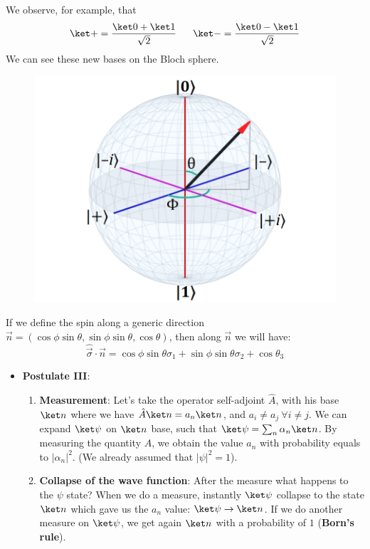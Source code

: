 \noindent We observe, for example, that
\begin{equation*}
    \ket + = \frac{\ket 0 + \ket 1}{\sqrt 2} \ \ \ \ \ \ket - = \frac{\ket 0 - \ket 1}{\sqrt 2}
\end{equation*}
\noindent We can see these new bases on the Bloch sphere.
\newline
\begin{figure}[!ht]
    \centering
    \includegraphics[scale=0.5]{images/chapter1/bloch-hdr-440.png}
    \label{fig:BlochSphere2}
\end{figure}
\newline
\noindent If we define the spin along a generic direction $\vec n = (\cos\phi\sin\theta, \sin\phi\sin\theta, \cos\theta)$, then along $\vec n$ we will have:
\begin{equation*}
    \hat{\vec{\sigma}} \cdot \vec n = \cos\phi\sin\theta\sigma_1+\sin\phi\sin\theta\sigma_2+\cos\theta_3
\end{equation*}
\begin{itemize}
    \item \textbf{Postulate III}:
    \begin{enumerate}
        \item \textbf{Measurement}: Let's take the operator self-adjoint $\hat A$, with his base $\ket n$ where we have $\hat A\ket n=a_n\ket n$, and $a_i\neq a_j \ \forall i\neq j$. We can expand $\ket \psi$ on $\ket n$ base, such that $\ket \psi = \sum_n \alpha_n\ket n$. By measuring the quantity $A$, we obtain the value $a_n$ with probability equals to $|\alpha_n|^2$. (We already assumed that $|\psi|^2=1$).
        \item \textbf{Collapse of the wave function}: After the measure what happens to the $\psi$ state? When we do a measure, instantly $\ket \psi$ collapse to the state $\ket n$ which gave us the $a_n$ value: $\ket \psi \rightarrow \ket n$. If we do another measure on $\ket \psi$, we get again $\ket n$ with a probability of $1$ (\textbf{Born's rule}).
    \end{enumerate}
\end{itemize}
